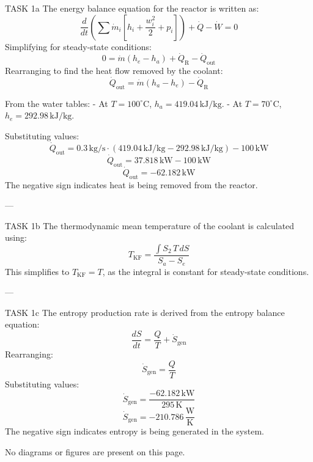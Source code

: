 TASK 1a  
The energy balance equation for the reactor is written as:  
\[
\frac{d}{dt} \left( \sum \dot{m}_i \left[ h_i + \frac{w_i^2}{2} + p_i \right] \right) + \dot{Q} - \dot{W} = 0
\]  
Simplifying for steady-state conditions:  
\[
0 = \dot{m} (h_e - h_a) + \dot{Q}_\text{R} - \dot{Q}_\text{out}
\]  
Rearranging to find the heat flow removed by the coolant:  
\[
\dot{Q}_\text{out} = \dot{m} (h_a - h_e) - \dot{Q}_\text{R}
\]  

From the water tables:  
- At \( T = 100^\circ\text{C} \), \( h_a = 419.04 \, \text{kJ/kg} \).  
- At \( T = 70^\circ\text{C} \), \( h_e = 292.98 \, \text{kJ/kg} \).  

Substituting values:  
\[
\dot{Q}_\text{out} = 0.3 \, \text{kg/s} \cdot (419.04 \, \text{kJ/kg} - 292.98 \, \text{kJ/kg}) - 100 \, \text{kW}
\]  
\[
\dot{Q}_\text{out} = 37.818 \, \text{kW} - 100 \, \text{kW}
\]  
\[
\dot{Q}_\text{out} = -62.182 \, \text{kW}
\]  
The negative sign indicates heat is being removed from the reactor.  

---

TASK 1b  
The thermodynamic mean temperature of the coolant is calculated using:  
\[
T_\text{KF} = \frac{\int S_2 \, T \, dS}{S_a - S_e}
\]  
This simplifies to \( T_\text{KF} = T \), as the integral is constant for steady-state conditions.  

---

TASK 1c  
The entropy production rate is derived from the entropy balance equation:  
\[
\frac{dS}{dt} = \frac{Q}{T} + \dot{S}_\text{gen}
\]  
Rearranging:  
\[
\dot{S}_\text{gen} = \frac{Q}{T}
\]  
Substituting values:  
\[
\dot{S}_\text{gen} = \frac{-62.182 \, \text{kW}}{295 \, \text{K}}
\]  
\[
\dot{S}_\text{gen} = -210.786 \, \frac{\text{W}}{\text{K}}
\]  
The negative sign indicates entropy is being generated in the system.  

No diagrams or figures are present on this page.